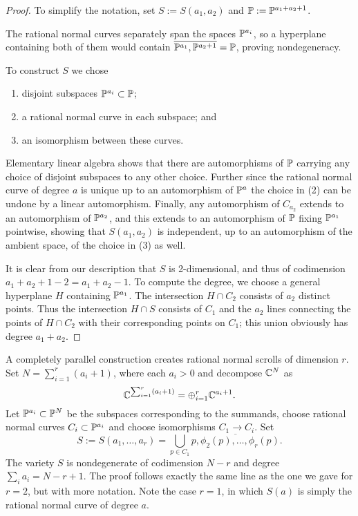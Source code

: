 \begin{proof} 
To simplify the notation, set $S := S(a_{1}, a_{2})$ and $\PP := \PP^{a_1+a_2+1}$.

 The rational normal curves separately span the spaces $\PP^{a_i}$, so a hyperplane containing both of them would contain $\overline{\PP^{a_1}, \PP^{a_{2}+1}} = \PP$, proving nondegeneracy. 

  To construct $S$ we chose 
\begin{enumerate}
 \item disjoint subspaces $\PP^{a_i}\subset \PP$;
 \item a rational normal curve in each subspace; and
 \item an isomorphism between these curves.
\end{enumerate}
Elementary linear algebra shows that there are automorphisms of $\PP$ carrying any choice of disjoint subspaces to any other choice. Further since the rational normal curve of degree $a$ is unique up to an automorphism of $\PP^{a}$ the choice in (2) can be undone by a linear automorphism. Finally, any automorphism of $C_{a_{2}}$ extends to an automorphism of $\PP^{a_{2}}$, and this extends to an automorphism of $\PP$ fixing $\PP^{a_{1}}$ pointwise,
showing that $S(a_{1}, a_{2})$ is independent, up to an automorphism of the ambient space, of the choice in (3)  as well.

 It is clear from our description that $S$ is 2-dimensional, and thus of
codimension $a_{1}+a_{2}+1 -2 = a_{1}+a_{2}-1$. To compute the degree, we choose a general hyperplane $H$ containing $\PP^{a_{1}}$. The intersection $H\cap C_{2}$ consists of $a_{2}$ distinct points. Thus the intersection $H\cap S$ consists of $C_{1}$ and the $a_{2}$ lines connecting 
the points of $H\cap C_{2}$ with their corresponding points on $C_{1}$; this union obviously has degree $a_{1}+a_{2}$.
\end{proof}

A completely parallel construction creates rational normal scrolls of dimension $r$. Set $N = \sum_{i=1}^{r}(a_{i}+1)$, where each $a_{i}>0$ and
decompose $\CC^{N}$ as
$$
\CC^{\sum_{i=1}^{r}(a_{i}+1)} = \oplus_{i=1}^{r}\CC^{a_{i}+1}.
$$
Let $\PP^{a_{i}}\subset \PP^{N}$ be the subspaces corresponding to the summands,  choose
rational normal curves $C_{i}\subset \PP^{a_{i}}$ and choose isomorphisms $C_{1}\to C_{i}$. 
Set
$$
S:=S(a_{1}, \dots, a_{r}) = \bigcup_{p\in C_{1}}\overline{p, \phi_{2}(p), \dots, \phi_{r}(p)}.
$$
The variety $S$ is nondegenerate of codimension $N-r$ and degree $\sum_{i}a_{i} = N-r+1$. The proof follows exactly the same line as the one we gave for $r=2$, but with more notation.
Note the case $r=1$, in which $S(a)$ is simply the rational normal curve of degree $a$. 

